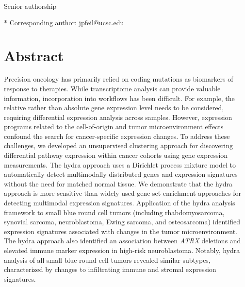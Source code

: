 \documentclass[10pt,letterpaper]{article}
\begin{document}
\begin{flushleft}
%
%

\ddag Senior authorship




* Corresponding author: jpfeil@ucsc.edu

\end{flushleft}
\section*{Abstract}
Precision oncology has primarily relied on coding mutations as biomarkers of response to therapies. While transcriptome analysis can provide valuable information, incorporation into workflows has been difficult. For example, the relative rather than absolute gene expression level needs to be considered, requiring differential expression analysis across samples. However, expression programs related to the cell-of-origin and tumor microenvironment effects confound the search for cancer-specific expression changes. To address these challenges, we developed an unsupervised clustering approach for discovering differential pathway expression within cancer cohorts using gene expression measurements. The hydra approach uses a Dirichlet process mixture model to automatically detect multimodally distributed genes and expression signatures without the need for matched normal tissue. We demonstrate that the hydra approach is more sensitive than widely-used gene set enrichment approaches for detecting multimodal expression signatures. Application of the hydra analysis framework to small blue round cell tumors (including rhabdomyosarcoma, synovial sarcoma, neuroblastoma, Ewing sarcoma, and osteosarcoma) identified expression signatures associated with changes in the tumor microenvironment. The hydra approach also identified an association between \textit{ATRX} deletions and elevated immune marker expression in high-risk neuroblastoma. Notably, hydra analysis of all small blue round cell tumors revealed similar subtypes, characterized by changes to infiltrating immune and stromal expression signatures.
\end{document}
